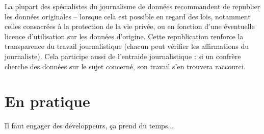 La plupart des spécialistes du journalisme de données recommandent de republier les
données originales -- lorsque cela est possible en regard des lois, notamment celles 
consacrées à la protection de la vie privée, ou en fonction d'une éventuelle licence
d'utilisation sur les données d'origine. Cette republication renforce la transparence
du travail journalistique (chacun peut vérifier les affirmations du journaliste).
Cela participe aussi de l'entraide journalistique : si un confrère cherche des données
sur le sujet concerné, son travail s'en trouvera raccourci.

\section{En pratique}

Il faut engager des développeurs, ça prend du temps...
